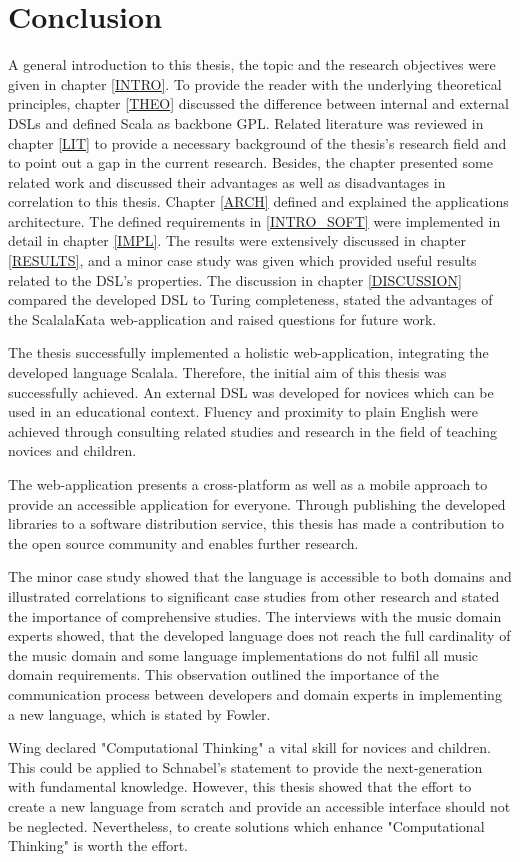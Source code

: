 \chapter{Conclusion}
\label{CONCLUSION}
A general introduction to this thesis, the topic and the research objectives were given in chapter \ref{INTRO}. To provide the reader with the underlying theoretical principles, chapter \ref{THEO} discussed the difference between internal and external DSLs and defined Scala as backbone GPL. Related literature was reviewed in chapter \ref{LIT} to provide a necessary background of the thesis's research field and to point out a gap in the current research. Besides, the chapter presented some related work and discussed their advantages as well as disadvantages in correlation to this thesis. Chapter \ref{ARCH} defined and explained the applications architecture. The defined requirements in \ref{INTRO_SOFT} were implemented in detail in chapter \ref{IMPL}. The results were extensively discussed in chapter \ref{RESULTS}, and a minor case study was given which provided useful results related to the DSL's properties. The discussion in chapter \ref{DISCUSSION} compared the developed DSL to Turing completeness, stated the advantages of the ScalalaKata web-application and raised questions for future work.

The thesis successfully implemented a holistic web-application, integrating the developed language Scalala. Therefore, the initial aim of this thesis was successfully achieved. An external DSL was developed for novices which can be used in an educational context. Fluency and proximity to plain English were achieved through consulting related studies and research in the field of teaching novices and children.

The web-application presents a cross-platform as well as a mobile approach to provide an accessible application for everyone. Through publishing the developed libraries to a software distribution service, this thesis has made a contribution to the open source community and enables further research.

The minor case study showed that the language is accessible to both domains and illustrated correlations to significant case studies from other research and stated the importance of comprehensive studies. The interviews with the music domain experts showed, that the developed language does not reach the full cardinality of the music domain and some language implementations do not fulfil all music domain requirements. This observation outlined the importance of the communication process between developers and domain experts in implementing a new language, which is stated by Fowler.\cite{Fowler2010}

Wing declared "Computational Thinking" a vital skill for novices and children.\cite{Wing2006} This could be applied to Schnabel's statement to provide the next-generation with fundamental knowledge.\cite{Schnabel2011} However, this thesis showed that the effort to create a new language from scratch and provide an accessible interface should not be neglected. Nevertheless, to create solutions which enhance "Computational Thinking" is worth the effort.